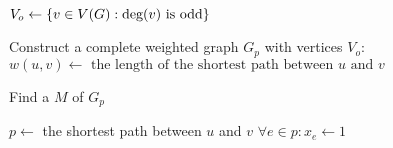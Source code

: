 
\begin{algorithm}[H]
  \begin{algorithmic}[1]
    \State $V_{o} \gets \left\{v \in V(G): \text{deg}(v) \text{ is odd}\right\}$

    \pause
    \Statex
    \State Construct a complete weighted graph $G_{p}$ with vertices $V_{o}$:
      \State $w(u,v) \gets \text{ the length of the shortest path between $u$ and $v$}$ 
    \EndFor

    \pause
    \Statex
    \State Find a  $M$ of $G_p$

    \pause
    \Statex
      \State $p \gets$ the shortest path between $u$ and $v$
      \State $\forall e \in p: x_e \gets 1$
    \EndFor
  \end{algorithmic}
\end{algorithm}
